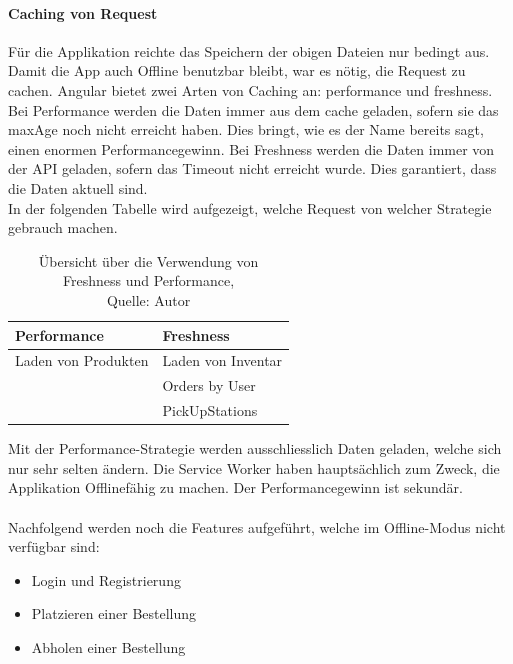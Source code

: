 \paragraph{Caching von Request}
Für die Applikation reichte das Speichern der obigen Dateien nur bedingt aus. Damit die App auch Offline benutzbar bleibt, war es nötig, die Request zu cachen. Angular bietet zwei Arten von Caching an: performance und freshness. Bei Performance werden die Daten immer aus dem cache geladen, sofern sie das maxAge noch nicht erreicht haben. Dies bringt, wie es der Name bereits sagt, einen enormen Performancegewinn. Bei Freshness werden die Daten immer von der API geladen, sofern das Timeout nicht erreicht wurde. Dies garantiert, dass die Daten aktuell sind. \\
In der folgenden Tabelle wird aufgezeigt, welche Request von welcher Strategie gebrauch machen. 

\begin{table}[H]
	\setlength\extrarowheight{2pt} %
	\begin{tabularx}{\textwidth}{|X|l|}
		\hline
		\textbf{Performance} & \textbf{Freshness} \\
		\hline
		Laden von Produkten& Laden von Inventar\\
		\hline
		& Orders by User\\
		\hline
		& PickUpStations\\
		\hline
	\end{tabularx} 
	\caption[Übersicht über die Verwendung von Freshness und Performance]{Übersicht über die Verwendung von Freshness und Performance,\\ Quelle: Autor}
\end{table}\label{performanceFreshness}
Mit der Performance-Strategie werden ausschliesslich Daten geladen, welche sich nur sehr selten ändern. Die Service Worker haben hauptsächlich zum Zweck, die Applikation Offlinefähig zu machen. Der Performancegewinn ist sekundär. \\\\
Nachfolgend werden noch die Features aufgeführt, welche im Offline-Modus nicht verfügbar sind: 
\begin{itemize}
	\item Login und Registrierung
	\item Platzieren einer Bestellung
	\item Abholen einer Bestellung
\end{itemize}

